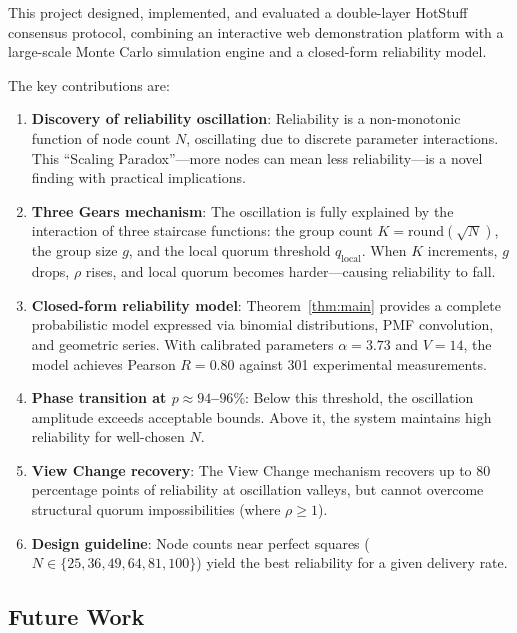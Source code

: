 \documentclass[
12pt,
oneside,
singlespacing,
parskip,
]{article}
\begin{document}
This project designed, implemented, and evaluated a double-layer HotStuff consensus protocol, combining an interactive web demonstration platform with a large-scale Monte Carlo simulation engine and a closed-form reliability model.

The key contributions are:

\begin{enumerate}
  \item \textbf{Discovery of reliability oscillation}: Reliability is a non-monotonic function of node count $N$, oscillating due to discrete parameter interactions. This ``Scaling Paradox''---more nodes can mean less reliability---is a novel finding with practical implications.

  \item \textbf{Three Gears mechanism}: The oscillation is fully explained by the interaction of three staircase functions: the group count $K = \mathrm{round}(\sqrt{N})$, the group size $g$, and the local quorum threshold $q_\mathrm{local}$. When $K$ increments, $g$ drops, $\rho$ rises, and local quorum becomes harder---causing reliability to fall.

  \item \textbf{Closed-form reliability model}: Theorem~\ref{thm:main} provides a complete probabilistic model expressed via binomial distributions, PMF convolution, and geometric series. With calibrated parameters $\alpha = 3.73$ and $V = 14$, the model achieves Pearson $R = 0.80$ against 301 experimental measurements.

  \item \textbf{Phase transition at $p \approx 94$--$96\%$}: Below this threshold, the oscillation amplitude exceeds acceptable bounds. Above it, the system maintains high reliability for well-chosen $N$.

  \item \textbf{View Change recovery}: The View Change mechanism recovers up to 80 percentage points of reliability at oscillation valleys, but cannot overcome structural quorum impossibilities (where $\rho \geq 1$).

  \item \textbf{Design guideline}: Node counts near perfect squares ($N \in \{25, 36, 49, 64, 81, 100\}$) yield the best reliability for a given delivery rate.
\end{enumerate}

\subsection{Future Work}
\end{document}

